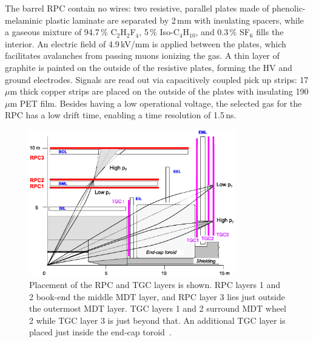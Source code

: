 The barrel RPC contain no wires: two resistive, parallel plates made of phenolic-melaminic plastic laminate are separated by 2\,mm with insulating spacers, while a gaseous mixture of 94.7\,\% C$_2$H$_2$F$_4$, 5\,\% Iso-C$_4$H$_{10}$, and 0.3\,\% SF$_6$ fills the interior. An electric field of 4.9\,kV/mm is applied between the plates, which facilitates avalanches
from passing muons ionizing the gas. A thin layer of graphite is painted on the outside of the resistive plates, forming the HV and ground electrodes. Signals are read out via capacitively coupled pick up strips: 17\,$\mu$m thick copper strips are placed on the outside of the plates
with insulating 190\,$\mu$m PET film. Besides having a low operational voltage, the selected gas for the RPC has a low drift time, enabling a time resolution of 1.5\,ns. 

\begin{figure}[tb]
\begin{center}
\includegraphics[width=0.8\textwidth]{figures/Atlas/RPC_TGC_schematics}
\end{center}
\caption[Schematic of muon trigger chambers]{Placement of the RPC and TGC layers is shown. RPC layers 1 and 2 book-end the middle MDT layer, and RPC layer 3 lies just outside the outermost MDT layer. TGC layers 1 and 2 surround MDT wheel 2 while TGC layer 3 is just beyond that. An additional TGC layer is placed just inside the end-cap toroid~\cite{ATLAS}.}
\label{fig:muon_trigger}
\end{figure}

